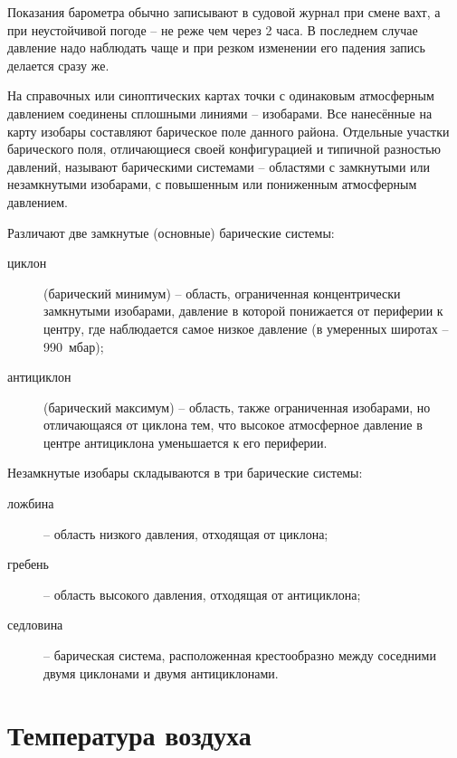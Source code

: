 Показания барометра обычно записывают в судовой журнал при смене вахт,
а при неустойчивой погоде \--- не реже чем через 2 часа. В последнем
случае давление надо наблюдать чаще и при резком изменении его падения
запись делается сразу же.

На справочных или синоптических картах точки с одинаковым атмосферным
давлением соединены сплошными линиями \--- изобарами. Все нанесённые
на карту изобары составляют барическое поле данного района. Отдельные
участки барического поля, отличающиеся своей конфигурацией и типичной
разностью давлений, называют барическими системами \--- областями с
замкнутыми или незамкнутыми изобарами, с повышенным или пониженным
атмосферным давлением.

Различают две замкнутые (основные) барические системы:

\begin{description}
\item[циклон]   (барический минимум) \--- область, ограниченная
  концентрически замкнутыми изобарами, давление в которой понижается
  от периферии к центру, где наблюдается самое низкое давление (в
  умеренных широтах \--- 990~мбар);
\item[антициклон]   (барический максимум) \--- область, также
  ограниченная изобарами, но отличающаяся от циклона тем, что высокое
  атмосферное давление в центре антициклона уменьшается к его
  периферии.
\end{description}

Незамкнутые изобары складываются в три барические системы:

\begin{description}
\item[ложбина] \--- область низкого давления, отходящая от циклона; 
\item[гребень] \--- область высокого давления, отходящая от антициклона; 
\item[седловина] \--- барическая система, расположенная крестообразно между соседними двумя циклонами и двумя антициклонами.
\end{description}

\section{Температура воздуха}

